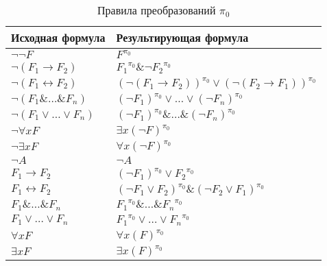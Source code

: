 \documentclass[a4paper]{jctart15b}
\begin{document}
\begin{table}[htbp]
	\caption{Правила преобразований $\pi_0$}\vspace*{2mm}

	\begin{tabular}{|l|l|}
		\hline
		\textbf{Исходная формула} & \textbf{Результирующая формула} \\
		\hline
		$\neg\neg F$ & $F^{\pi_0}$ \\

		\hline
		$\neg (F_1 \rightarrow F_2)$ & ${F_1}^{\pi_0} \& {\neg F_2}^{\pi_0}$ \\

		\hline
		$\neg (F_1 \leftrightarrow F_2)$ & $(\neg(F_1 \rightarrow F_2))^{\pi_0} \vee (\neg(F_2 \rightarrow F_1))^{\pi_0}$ \\

		\hline
		$\neg (F_1 \&\ldots\& F_n)$ & $(\neg F_1)^{\pi_0} \vee\ldots\vee (\neg F_n)^{\pi_0}$ \\

		\hline
		$\neg (F_1 \vee\ldots\vee F_n)$ & $(\neg F_1)^{\pi_0} \&\ldots\& (\neg F_n)^{\pi_0}$ \\

		\hline
		$\neg\forall{x}F$ & $\exists{x}(\neg F)^{\pi_0}$ \\

		\hline
		$\neg\exists{x}F$ & $\forall{x}(\neg F)^{\pi_0}$ \\

		\hline
		$\neg A$ & $\neg A$ \\

		\hline
		$F_1 \rightarrow F_2$ & $(\neg F_1)^{\pi_0} \vee {F_2}^{\pi_0}$ \\

		\hline
		$F_1 \leftrightarrow F_2$ & $(\neg F_1 \vee F_2)^{\pi_0} \& (\neg F_2 \vee F_1)^{\pi_0} $ \\

		\hline
		$F_1 \&\ldots\& F_n$ & ${F_1}^{\pi_0} \&\ldots\& {F_n}^{\pi_0} $ \\

		\hline
		$F_1 \vee\ldots\vee F_n$ & ${F_1}^{\pi_0} \vee\ldots\vee {F_n}^{\pi_0} $ \\

		\hline
		$\forall{x}F$ & $\forall{x}(F)^{\pi_0} $ \\

		\hline
		$\exists{x}F$ & $\exists{x}(F)^{\pi_0} $ \\

		\hline
	\end{tabular}
\end{table}
\end{document}
